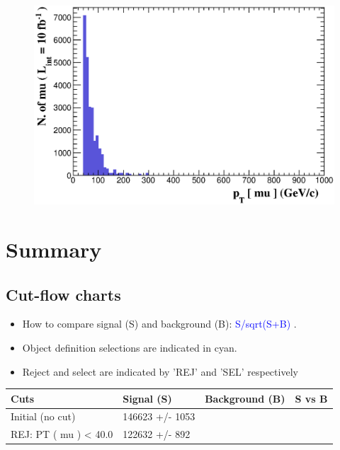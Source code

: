 \documentclass[a4paper, 10pt]{article}
\begin{document}
\begin{figure}[H]
  \begin{center}
    \includegraphics[scale=0.45]{selection_1.eps}\\
\caption{   }
  \end{center}
\end{figure}
\newpage
\section{ Summary}

\subsection{Cut-flow charts}

\begin{itemize}
  \item How to compare signal (S) and background (B): \textcolor{blue}{S/\-sqrt(S+B)} .
   \item Object definition selections are indicated in cyan.  \item Reject and select are indicated by 'REJ' and 'SEL' respectively
\end{itemize}
\begin{table}[H]
  \begin{center}
    \begin{tabular}{|m{36.0mm}|m{36.0mm}|m{36.0mm}|m{33.0mm}|}
      \hline
      {\cellcolor{yellow}        Cuts}& {\cellcolor{yellow}         Signal (S)}& {\cellcolor{yellow}         Background (B)}& {\cellcolor{yellow}         S vs B}\\
      \hline
      {\cellcolor{white}         Initial (no cut)}& {\cellcolor{white}         146623 +/\-- 1053}& {\cellcolor{white}         }& {\cellcolor{white}         }\\
      \hline
      {\cellcolor{white} REJ: PT ( mu ) < 40.0}& {\cellcolor{white}         122632 +/\-- 892}& {\cellcolor{white}         }& {\cellcolor{white}         }\\
\hline
    \end{tabular}
  \end{center}
\end{table}
\end{document}
